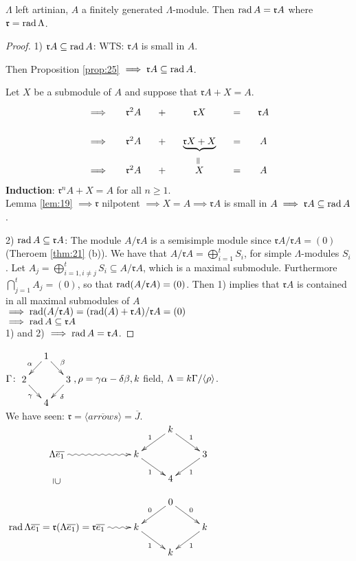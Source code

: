 \begin{thm}\label{thm:26}
$\Lambda$ left artinian, $A$ a finitely generated $\Lambda$-module.
Then $\operatorname{rad}\nolimits A=\mathfrak{r}A$ where $\mathfrak{r} = \operatorname{rad}\nolimits \Lambda$. 
\begin{proof}
1) $\mathfrak{r}A \subseteq \operatorname{rad}\nolimits A$: WTS: $\mathfrak{r}A$ is small in $A$.

Then Proposition \ref{prop:25} $\implies \mathfrak{r}A \subseteq \operatorname{rad}\nolimits
A$.

Let $X$ be a submodule of $A$ and suppose that $\mathfrak{r}A + X =
A$. 
\[\xymatrix@C-1pc@R-1pc{
\implies & \mathfrak{r}^2A &+& \mathfrak{r}X &=& \mathfrak{r}A\\
\implies & \mathfrak{r}^2A &+& \relax\underbrace{\mathfrak{r}X + X}\ar@{}[d]|-*[@]{=} &=& A\\
\implies & \mathfrak{r}^2A &+& X &=& A
}\]
\textbf{Induction}: $\mathfrak{r}^nA + X = A$ for all $n \geq 1$.\\
Lemma \ref{lem:19} $\implies \mathfrak{r}$ nilpotent $\implies X = A
\implies \mathfrak{r}A$ is small in $A \implies \mathfrak{r}A
\subseteq \operatorname{rad}\nolimits A$. 

2) $\operatorname{rad}\nolimits A \subseteq \mathfrak{r}A$:
The module $A/\mathfrak{r}A$ is a semisimple module since
$\mathfrak{r} A/\mathfrak{r}A = (0)$ (Theroem \ref{thm:21} (b)). 
We have that $A/\mathfrak{r}A = \bigoplus_{i=1}^t S_i$, for simple
$\Lambda$-modules $S_i$. Let $A_j =\bigoplus_{i=1, i\neq j}^t S_i
\subseteq A/\mathfrak{r}A$, which is a maximal submodule. Furthermore
$\bigcap_{j=1}^t A_j = (0)$, so that $\operatorname{rad}\nolimits(A/\mathfrak{r}A) = (0)$.
Then 1) implies that $\mathfrak{r}A$ is contained in all maximal submodules of $A$\\
$\implies \operatorname{rad}\nolimits (A/\mathfrak{r}A) = (\operatorname{rad}\nolimits (A)+\mathfrak{r}A)/\mathfrak{r}A = (0)$\\
$\implies \operatorname{rad}\nolimits A \subseteq \mathfrak{r}A$\\
1) and 2) $\implies \operatorname{rad}\nolimits A = \mathfrak{r}A$.
\end{proof} 
\end{thm}

\begin{exam}
$\G \colon 
\vcenter{\xymatrix@C-1pc@R-1pc
{
& 1\ar[dl]_\alpha\ar[dr]^\beta & \\
2\ar[dr]_\gamma && 3\ar[dl]^\delta\\
& 4 &
}}, 
\rho = \gamma\alpha-\delta\beta, k$ field, $\Lambda = k\Gamma / \langle \rho \rangle$.
\\
We have seen: $\mathfrak{r} = \langle \overline{arrows} \rangle = \overline{J}$.\\
$\xymatrix@R-1pc
{
&& k\ar[dl]_1\ar[dr]^1 & \\
\Lambda \overline{e_1}\ar@{~>}[r]\ar@{}[dd]|-*[@]{\supseteq} & k\ar[dr]_1 && 3\ar[dl]^1\\
&& 4 &
\\
&& 0\ar[dl]_0\ar[dr]^0 & \\
\rad \Lambda \overline{e_1} = \mathfrak{r}(\Lambda \overline{e_1}) = \mathfrak{r}\overline{e_1}\ar@{~>}[r] &  k\ar[dr]_1 && k\ar[dl]^1\\
&& k &
}$
\end{exam}

